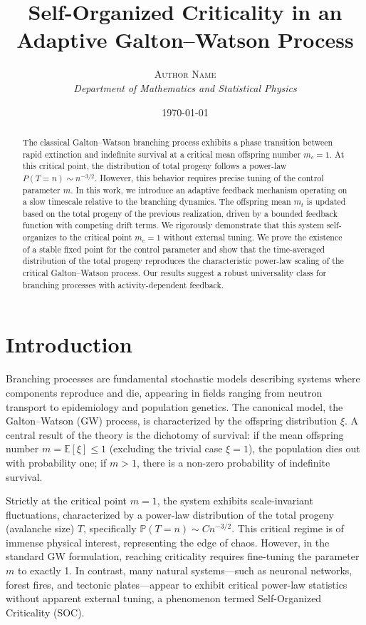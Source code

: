 \documentclass[11pt, a4paper]{article}
\title{\textbf{Self-Organized Criticality in an Adaptive Galton--Watson Process}}
\author{\textsc{Author Name} \\ 
\textit{Department of Mathematics and Statistical Physics}}
\date{\today}
\theoremstyle{definition}
\newcommand{\E}{\mathbb{E}}
\renewcommand{\P}{\mathbb{P}}
\begin{document}
\maketitle

\begin{abstract}
The classical Galton--Watson branching process exhibits a phase transition between rapid extinction and indefinite survival at a critical mean offspring number $m_c = 1$. At this critical point, the distribution of total progeny follows a power-law $P(T=n) \sim n^{-3/2}$. However, this behavior requires precise tuning of the control parameter $m$. In this work, we introduce an adaptive feedback mechanism operating on a slow timescale relative to the branching dynamics. The offspring mean $m_t$ is updated based on the total progeny of the previous realization, driven by a bounded feedback function with competing drift terms. We rigorously demonstrate that this system self-organizes to the critical point $m_c=1$ without external tuning. We prove the existence of a stable fixed point for the control parameter and show that the time-averaged distribution of the total progeny reproduces the characteristic power-law scaling of the critical Galton--Watson process. Our results suggest a robust universality class for branching processes with activity-dependent feedback.
\end{abstract}

\section{Introduction}

Branching processes are fundamental stochastic models describing systems where components reproduce and die, appearing in fields ranging from neutron transport to epidemiology and population genetics. The canonical model, the Galton--Watson (GW) process, is characterized by the offspring distribution $\xi$. A central result of the theory is the dichotomy of survival: if the mean offspring number $m = \E[\xi] \le 1$ (excluding the trivial case $\xi=1$), the population dies out with probability one; if $m > 1$, there is a non-zero probability of indefinite survival.

Strictly at the critical point $m=1$, the system exhibits scale-invariant fluctuations, characterized by a power-law distribution of the total progeny (avalanche size) $T$, specifically $\P(T=n) \sim C n^{-3/2}$. This critical regime is of immense physical interest, representing the edge of chaos. However, in the standard GW formulation, reaching criticality requires fine-tuning the parameter $m$ to exactly 1. In contrast, many natural systems---such as neuronal networks, forest fires, and tectonic plates---appear to exhibit critical power-law statistics without apparent external tuning, a phenomenon termed Self-Organized Criticality (SOC).
\end{document}

